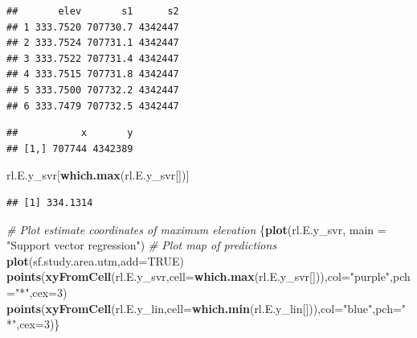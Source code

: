 \documentclass[
]{book}
\newenvironment{Shaded}{\begin{snugshade}}{\end{snugshade}}
\newcommand{\AttributeTok}[1]{\textcolor[rgb]{0.13,0.29,0.53}{#1}}
\newcommand{\CommentTok}[1]{\textcolor[rgb]{0.56,0.35,0.01}{\textit{#1}}}
\newcommand{\ConstantTok}[1]{\textcolor[rgb]{0.56,0.35,0.01}{#1}}
\newcommand{\DecValTok}[1]{\textcolor[rgb]{0.00,0.00,0.81}{#1}}
\newcommand{\FunctionTok}[1]{\textcolor[rgb]{0.13,0.29,0.53}{\textbf{#1}}}
\newcommand{\NormalTok}[1]{#1}
\newcommand{\OtherTok}[1]{\textcolor[rgb]{0.56,0.35,0.01}{#1}}
\newcommand{\SpecialCharTok}[1]{\textcolor[rgb]{0.81,0.36,0.00}{\textbf{#1}}}
\newcommand{\StringTok}[1]{\textcolor[rgb]{0.31,0.60,0.02}{#1}}
\begin{document}
\begin{verbatim}
##       elev       s1      s2
## 1 333.7520 707730.7 4342447
## 2 333.7524 707731.1 4342447
## 3 333.7522 707731.4 4342447
## 4 333.7515 707731.8 4342447
## 5 333.7500 707732.2 4342447
## 6 333.7479 707732.5 4342447
\end{verbatim}

\begin{Shaded}
\end{Shaded}

\begin{verbatim}
##           x       y
## [1,] 707744 4342389
\end{verbatim}

\begin{Shaded}
\begin{Highlighting}[]
\NormalTok{rl.E.y\_svr[}\FunctionTok{which.max}\NormalTok{(rl.E.y\_svr[])]}
\end{Highlighting}
\end{Shaded}

\begin{verbatim}
## [1] 334.1314
\end{verbatim}

\begin{Shaded}
\begin{Highlighting}[]
\CommentTok{\# Plot estimate coordinates of maximum elevation}
\NormalTok{\{}\FunctionTok{plot}\NormalTok{(rl.E.y\_svr, }\AttributeTok{main =} \StringTok{"Support vector regression"}\NormalTok{) }\CommentTok{\# Plot map of predictions}
\FunctionTok{plot}\NormalTok{(sf.study.area.utm,}\AttributeTok{add=}\ConstantTok{TRUE}\NormalTok{)}
\FunctionTok{points}\NormalTok{(}\FunctionTok{xyFromCell}\NormalTok{(rl.E.y\_svr,}\AttributeTok{cell=}\FunctionTok{which.max}\NormalTok{(rl.E.y\_svr[])),}\AttributeTok{col=}\StringTok{"purple"}\NormalTok{,}\AttributeTok{pch=}\StringTok{"*"}\NormalTok{,}\AttributeTok{cex=}\DecValTok{3}\NormalTok{)}
\FunctionTok{points}\NormalTok{(}\FunctionTok{xyFromCell}\NormalTok{(rl.E.y\_lin,}\AttributeTok{cell=}\FunctionTok{which.min}\NormalTok{(rl.E.y\_lin[])),}\AttributeTok{col=}\StringTok{"blue"}\NormalTok{,}\AttributeTok{pch=}\StringTok{"*"}\NormalTok{,}\AttributeTok{cex=}\DecValTok{3}\NormalTok{)\}}
\end{Highlighting}
\end{Shaded}
\end{document}
